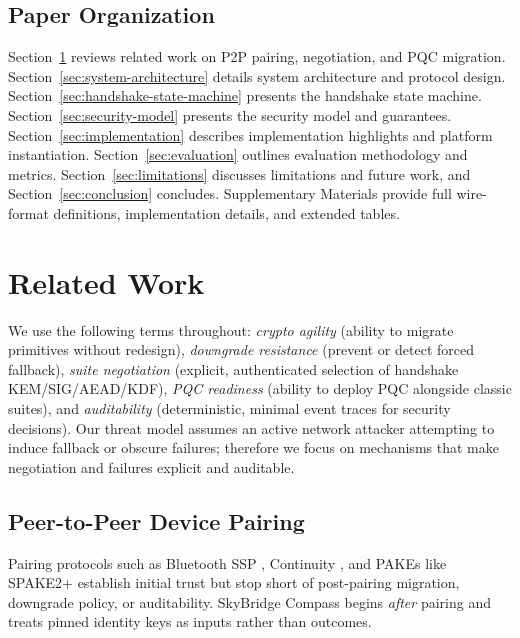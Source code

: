 \documentclass[10pt,journal,compsoc]{IEEEtran}
\begin{document}
\subsection{Paper Organization}\label{b.-paper-organization}

Section~\ref{sec:related-work} reviews related work on P2P pairing,
negotiation, and PQC migration. Section~\ref{sec:system-architecture}
details system architecture and protocol design.
Section~\ref{sec:handshake-state-machine} presents the handshake state
machine. Section~\ref{sec:security-model} presents the security model
and guarantees. Section~\ref{sec:implementation} describes
implementation highlights and platform instantiation. Section~\ref{sec:evaluation}
outlines evaluation methodology and metrics. Section~\ref{sec:limitations}
discusses limitations and future work, and Section~\ref{sec:conclusion}
concludes. Supplementary Materials provide full wire-format definitions,
implementation details, and extended tables.



\section{Related Work}\label{sec:related-work}

We use the following terms throughout: \emph{crypto agility} (ability to
migrate primitives without redesign), \emph{downgrade resistance}
(prevent or detect forced fallback), \emph{suite negotiation} (explicit,
authenticated selection of handshake KEM/SIG/AEAD/KDF), \emph{PQC readiness}
(ability to deploy PQC alongside classic suites), and \emph{auditability}
(deterministic, minimal event traces for security decisions). Our threat
model assumes an active network attacker attempting to induce fallback
or obscure failures; therefore we focus on mechanisms that make
negotiation and failures explicit and auditable.

\subsection{Peer-to-Peer Device
Pairing}\label{a.-peer-to-peer-device-pairing}

Pairing protocols such as Bluetooth SSP \cite{ref2}, Continuity \cite{ref3},
and PAKEs like SPAKE2+ \cite{ref4} establish initial trust but stop short
of post-pairing migration, downgrade policy, or auditability. SkyBridge
Compass begins \emph{after} pairing and treats pinned identity keys as
inputs rather than outcomes.
\end{document}
